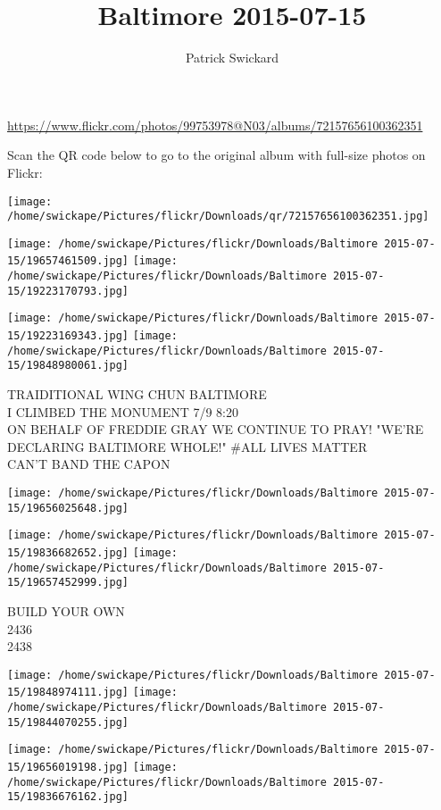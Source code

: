 \documentclass[10pt,letterpaper]{article}
\title{Baltimore 2015-07-15}
\author{Patrick Swickard}
\date{}
\begin{document}
\maketitle

\url{https://www.flickr.com/photos/99753978@N03/albums/72157656100362351}

Scan the QR code below to go to the original album with full-size photos on Flickr:

\texttt{[image: /home/swickape/Pictures/flickr/Downloads/qr/72157656100362351.jpg]}
\pagebreak

\texttt{[image: /home/swickape/Pictures/flickr/Downloads/Baltimore 2015-07-15/19657461509.jpg]}
\texttt{[image: /home/swickape/Pictures/flickr/Downloads/Baltimore 2015-07-15/19223170793.jpg]}

\texttt{[image: /home/swickape/Pictures/flickr/Downloads/Baltimore 2015-07-15/19223169343.jpg]}
\texttt{[image: /home/swickape/Pictures/flickr/Downloads/Baltimore 2015-07-15/19848980061.jpg]}

TRAIDITIONAL WING CHUN BALTIMORE\\
I CLIMBED THE MONUMENT 7/9 8:20\\
ON BEHALF OF FREDDIE GRAY WE CONTINUE TO PRAY!  "WE'RE DECLARING BALTIMORE WHOLE!"  \#ALL LIVES MATTER\\
CAN'T BAND THE CAPON
\pagebreak

\texttt{[image: /home/swickape/Pictures/flickr/Downloads/Baltimore 2015-07-15/19656025648.jpg]}

\vspace{0.25in}
\texttt{[image: /home/swickape/Pictures/flickr/Downloads/Baltimore 2015-07-15/19836682652.jpg]}
\texttt{[image: /home/swickape/Pictures/flickr/Downloads/Baltimore 2015-07-15/19657452999.jpg]}

BUILD YOUR OWN\\
2436\\
2438
\pagebreak

\texttt{[image: /home/swickape/Pictures/flickr/Downloads/Baltimore 2015-07-15/19848974111.jpg]}
\texttt{[image: /home/swickape/Pictures/flickr/Downloads/Baltimore 2015-07-15/19844070255.jpg]}

\texttt{[image: /home/swickape/Pictures/flickr/Downloads/Baltimore 2015-07-15/19656019198.jpg]}
\texttt{[image: /home/swickape/Pictures/flickr/Downloads/Baltimore 2015-07-15/19836676162.jpg]}
\end{document}
